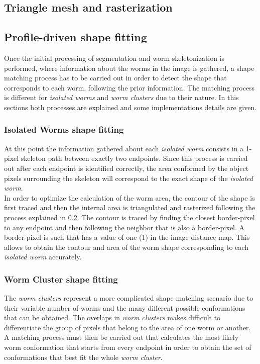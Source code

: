 \subsection{Triangle mesh and rasterization}
\label{sec:metrast}


\subsection{Profile-driven shape fitting}
\label{sec:metfit}

Once the initial processing of segmentation and worm skeletonization is performed, where 
information about the worms in the image is gathered, a shape matching process has to be 
carried out in order to detect the shape that corresponds to each worm, 
following the prior information. The matching process is different for
\emph{isolated worms} and \emph{worm clusters}  
due to their nature. In this sections both processes are explained and some 
implementations details are given.


\subsubsection{Isolated Worms shape fitting}
\label{sec:metiso}

At this point the information gathered about each \emph{isolated worm} consists in 
a 1-pixel skeleton path between exactly two endpoints. Since this process is carried
out after each endpoint is identified correctly, the area conformed by the object pixels
surrounding the skeleton will correspond to the exact shape of the \emph{isolated worm}.\\

In order to optimize the calculation of the worm area, the contour of the shape is first
traced and then the internal area is triangulated and rasterized following the process
explained in \ref{sec:metfit}. The contour is traced by finding the closest border-pixel
to any endpoint and then following the neighbor that is also a border-pixel. A
border-pixel is such that has a value of one (1) in the image distance map.
This allows to obtain the contour and area of the worm shape corresponding to each 
\emph{isolated worm} accurately.


\subsubsection{Worm Cluster shape fitting}
\label{sec:clusterfit}

The \emph{worm clusters} represent a more complicated shape matching scenario due to their
variable number of worms and the many different possible conformations that can be obtained. 
The  overlaps in \emph{worm clusters} makes difficult to differentiate the group of pixels
that belong to the area of one worm or another. A matching process must then be 
carried out that calculates the most likely worm conformation that starts from every
endpoint in order to obtain the set of conformations that best fit the whole 
\emph{worm cluster}.\\

